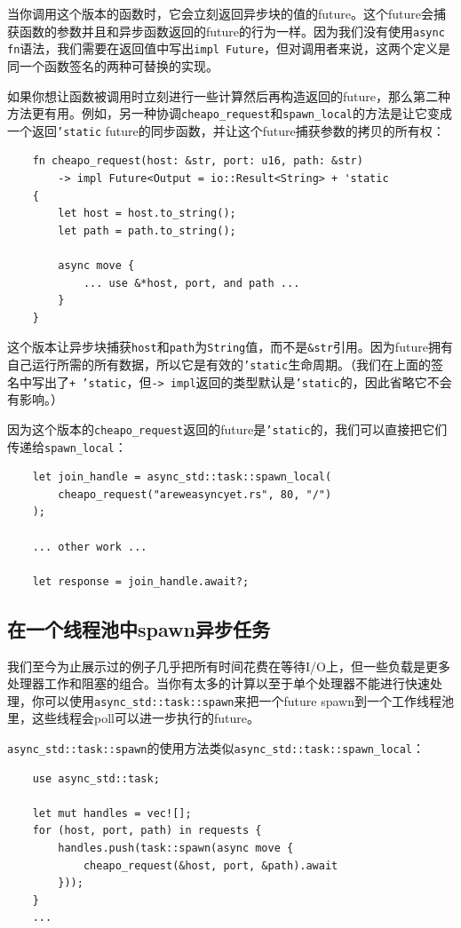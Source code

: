 当你调用这个版本的函数时，它会立刻返回异步块的值的future。这个future会捕获函数的参数并且和异步函数返回的future的行为一样。因为我们没有使用\texttt{async fn}语法，我们需要在返回值中写出\texttt{impl Future}，但对调用者来说，这两个定义是同一个函数签名的两种可替换的实现。

如果你想让函数被调用时立刻进行一些计算然后再构造返回的future，那么第二种方法更有用。例如，另一种协调\texttt{cheapo\_request}和\texttt{spawn\_local}的方法是让它变成一个返回\texttt{'static} future的同步函数，并让这个future捕获参数的拷贝的所有权：
\begin{verbatim}
    fn cheapo_request(host: &str, port: u16, path: &str)    
        -> impl Future<Output = io::Result<String> + 'static
    {
        let host = host.to_string();
        let path = path.to_string();

        async move {
            ... use &*host, port, and path ...
        }
    }
\end{verbatim}

这个版本让异步块捕获\texttt{host}和\texttt{path}为\texttt{String}值，而不是\texttt{\&str}引用。因为future拥有自己运行所需的所有数据，所以它是有效的\texttt{'static}生命周期。（我们在上面的签名中写出了\texttt{+ 'static}，但\texttt{-> impl}返回的类型默认是\texttt{'static}的，因此省略它不会有影响。）

因为这个版本的\texttt{cheapo\_request}返回的future是\texttt{'static}的，我们可以直接把它们传递给\texttt{spawn\_local}：
\begin{verbatim}
    let join_handle = async_std::task::spawn_local(
        cheapo_request("areweasyncyet.rs", 80, "/")
    );

    ... other work ...

    let response = join_handle.await?;
\end{verbatim}

\subsection{在一个线程池中spawn异步任务}
我们至今为止展示过的例子几乎把所有时间花费在等待I/O上，但一些负载是更多处理器工作和阻塞的组合。当你有太多的计算以至于单个处理器不能进行快速处理，你可以使用\texttt{async\_std::task::spawn}来把一个future spawn到一个工作线程池里，这些线程会poll可以进一步执行的future。

\texttt{async\_std::task::spawn}的使用方法类似\texttt{async\_std::task::spawn\_local}：
\begin{verbatim}
    use async_std::task;

    let mut handles = vec![];
    for (host, port, path) in requests {
        handles.push(task::spawn(async move {
            cheapo_request(&host, port, &path).await
        }));
    }
    ...
\end{verbatim}

